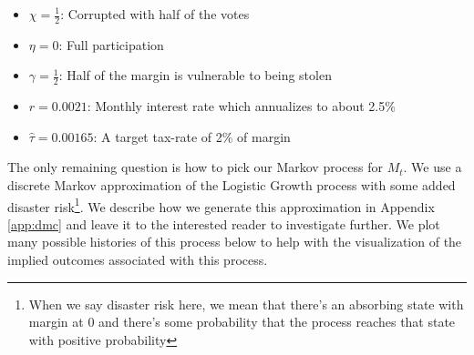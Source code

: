 \begin{itemize}
  \item $\chi = \frac{1}{2}$: Corrupted with half of the votes
  \item $\eta = 0$: Full participation
  \item $\gamma = \frac{1}{2}$: Half of the margin is vulnerable to being stolen
  \item $r = 0.0021$: Monthly interest rate which annualizes to about 2.5\%
  \item $\hat{\tau} = 0.00165$: A target tax-rate of 2\% of margin
\end{itemize}

The only remaining question is how to pick our Markov process for $M_t$. We use a discrete Markov
approximation of the Logistic Growth process with some added disaster risk\footnote{When we say
disaster risk here, we mean that there's an absorbing state with margin at 0 and there's some
probability that the process reaches that state with positive probability}. We describe how we
generate this approximation in Appendix \ref{app:dmc} and leave it to the interested reader to
investigate further. We plot many possible histories of this process below to help with the
visualization of the implied outcomes associated with this process.

\begin{center}
  \begin{figure}[H]
    \label{fig:sm_stochastic_margin_growth}
  \end{figure}
\end{center}

